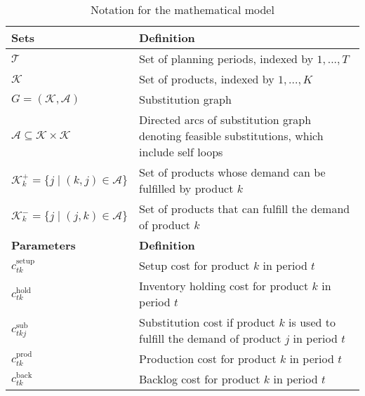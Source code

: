 \documentclass[11pt]{article}
\newcommand{\ti}{t} %
\newcommand{\TI}{\mathcal{T}}
\newcommand{\Ti}{T}
\newcommand{\ka}{k} %
\newcommand{\KA}{\mathcal{K}}
\newcommand{\Ka}{K}
\newcommand{\jey}{j} %
\newcommand{\Graf}{\mathcal{A}} %
\newcommand{\cn}{\mathcal{C}(n) }
\newcommand{\Csub}{\mathcal{K}^+_k}
\newcommand{\Psub}{\mathcal{K}^-_k}
\begin{document}
\begin{table}[H]
\centering
\caption{Notation for the mathematical model}
\begin{adjustbox}{width=1\textwidth,center=\textwidth}
\begin{tabular}{ll}
\toprule
{\textbf {Sets}} & {\textbf {Definition}} \\ \midrule
$\TI$  & Set of planning periods, indexed by $1, ... ,\Ti$ \\ 
$\KA$  & Set of products, indexed by $1, ... ,\Ka$ \\
$ G = (\KA,\mathcal{A})$  & Substitution graph \\
$ \Graf \subseteq \KA \times \KA$  & Directed arcs of substitution graph denoting feasible substitutions, which include self loops
\\
$  \Csub = \{\jey \mid (\ka,\jey) \in \Graf\}$  & Set of products whose demand can be fulfilled by product $\ka$  \\
$ \Psub = \{\jey \mid (\jey,\ka) \in \Graf\}$  & Set of products that can fulfill the demand of product $\ka$  \\
\midrule 
{\textbf {Parameters}} & {\textbf {Definition}} \\ \midrule
$c^{\text{setup}}_{\ti \ka}$ & Setup cost for product $\ka$ in period $\ti$ \\ 
$c^{\text{hold}}_{\ti \ka}$  & Inventory holding cost for product $k$ in period $\ti$  \\ 
$c^{\text{sub}}_{\ti \ka \jey }$  & Substitution cost if product $\ka$  is used to fulfill the demand of product $\jey$  in period $\ti$  \\ 
$c^{\text{prod}}_{\ti \ka}$  & Production cost for product $\ka$ in period $\ti$  \\
$c^{\text{back}}_{\ti \ka}$  & Backlog cost for product $\ka$  in period $\ti$ \\

\end{tabular}
\end{adjustbox}
\end{table}
\end{document}
